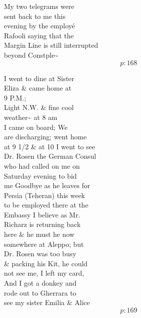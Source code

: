 \documentclass{report}
\begin{document}
	\par{
 	My two telegrams were\ \\sent back to me this\ \\evening by the employé\ \\Rafooli saying that the\ \\Margin Line is still interrupted\ \\beyond Constple\~{}\ \\
  \[p: 168 \]

	}





	\par{
 	I went to dine at Sister\ \\Eliza \& came home at\ \\9 P.M.;\ \\Light N.W. \& fine cool\ \\weather\~{} at 8 am\ \\I came on board; We\ \\are discharging; went home\ \\at 9 1/2 \& at 10 I went to see\ \\Dr. Rosen the German Consul\ \\who had called on me on\ \\Saturday evening to bid\ \\me Goodbye as he leaves for\ \\Persia (Teheran) this week\ \\to be employed there at the\ \\Embassy I believe as Mr.\ \\Richarz is returning back\ \\here \& he must he now\ \\somewhere at Aleppo; but\ \\Dr. Rosen was too busy\ \\\& packing his Kit, he could\ \\not see me, I left my card,\ \\And I got a donkey and\ \\rode out to Gherrara to\ \\see my sister Emilia \& Alice\ \\
  \[p: 169 \]

	}
\end{document}
